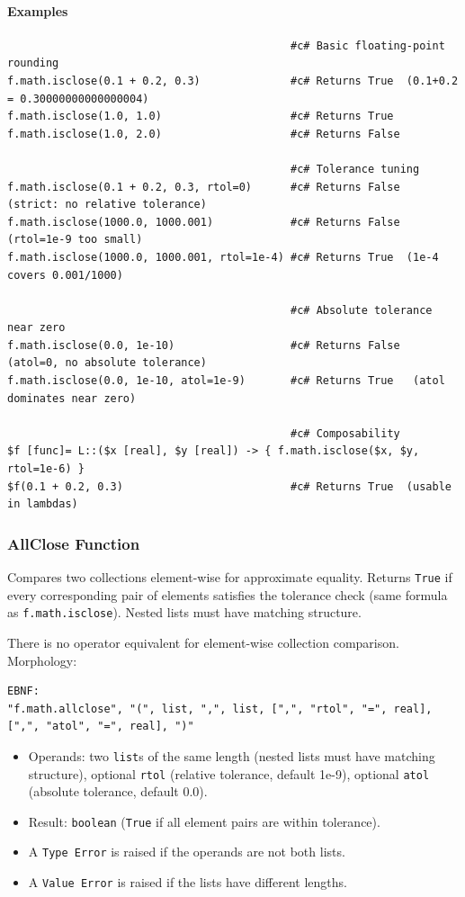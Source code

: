 \paragraph{Examples}
\begin{verbatim}
                                            #c# Basic floating-point rounding
f.math.isclose(0.1 + 0.2, 0.3)              #c# Returns True  (0.1+0.2 = 0.30000000000000004)
f.math.isclose(1.0, 1.0)                    #c# Returns True
f.math.isclose(1.0, 2.0)                    #c# Returns False

                                            #c# Tolerance tuning
f.math.isclose(0.1 + 0.2, 0.3, rtol=0)      #c# Returns False  (strict: no relative tolerance)
f.math.isclose(1000.0, 1000.001)            #c# Returns False  (rtol=1e-9 too small)
f.math.isclose(1000.0, 1000.001, rtol=1e-4) #c# Returns True  (1e-4 covers 0.001/1000)

                                            #c# Absolute tolerance near zero
f.math.isclose(0.0, 1e-10)                  #c# Returns False  (atol=0, no absolute tolerance)
f.math.isclose(0.0, 1e-10, atol=1e-9)       #c# Returns True   (atol dominates near zero)

                                            #c# Composability
$f [func]= L::($x [real], $y [real]) -> { f.math.isclose($x, $y, rtol=1e-6) }
$f(0.1 + 0.2, 0.3)                          #c# Returns True  (usable in lambdas)
\end{verbatim}

\subsubsection{AllClose Function}
\label{sec:allclose}
Compares two collections element-wise for approximate equality. Returns \texttt{True} if every corresponding pair of elements satisfies the tolerance check (same formula as \texttt{f.math.isclose}). Nested lists must have matching structure.

There is no operator equivalent for element-wise collection comparison.\\
Morphology:
\begin{verbatim}
EBNF:
"f.math.allclose", "(", list, ",", list, [",", "rtol", "=", real], [",", "atol", "=", real], ")"
\end{verbatim}
\begin{itemize}
\item Operands: two \texttt{list}s of the same length (nested lists must have matching structure), optional \texttt{rtol} (relative tolerance, default 1e-9), optional \texttt{atol} (absolute tolerance, default 0.0).
\item Result: \texttt{boolean} (\texttt{True} if all element pairs are within tolerance).
\item A \texttt{Type Error} is raised if the operands are not both lists.
\item A \texttt{Value Error} is raised if the lists have different lengths.
\end{itemize}

